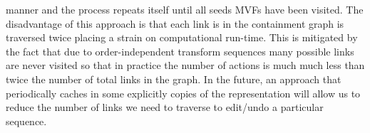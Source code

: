 manner and the process repeats itself until all seeds MVFs have been visited. The disadvantage of this approach is that each link is in the containment graph is traversed twice placing a strain on computational run-time. This is mitigated by the fact that due to order-independent transform sequences many possible links are never visited so that in practice the number of actions is much much less than twice the number of total links in the graph. In the future, an approach that periodically caches in some explicitly copies of the representation will allow us to reduce the number of links we need to traverse to edit/undo a particular sequence. 

















